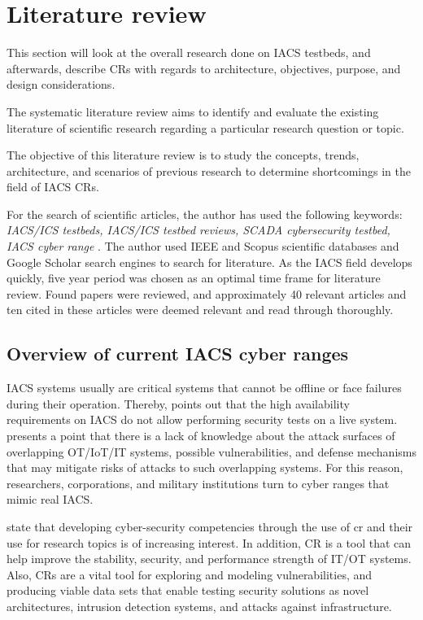 \section{Literature review} \label{sec:lit-rev}

This section will look at the overall research done on IACS testbeds, and afterwards, describe CRs with regards to architecture, objectives, purpose, and design considerations.
 

The systematic literature review aims to identify and evaluate the existing literature of scientific research regarding a particular research question or topic.

The objective of this literature review is to study the concepts, trends, architecture, and scenarios of previous research to determine shortcomings in the field of IACS CRs.

For the search of scientific articles, the author has used the following keywords: \textit{ IACS/ICS testbeds, IACS/ICS testbed reviews, SCADA cybersecurity testbed, IACS cyber range }. The author used IEEE and Scopus scientific databases and Google Scholar search engines to search for literature. As the IACS field develops quickly, five year period was chosen as an optimal time frame for literature review. Found papers were reviewed, and approximately 40 relevant articles and ten cited in these articles were deemed relevant and read through thoroughly.

\subsection{Overview of current IACS cyber ranges}

IACS systems usually are critical systems that cannot be offline or face failures during their operation. Thereby, \citeauthor{02-surway} \parencite{02-surway} points out that the high availability requirements on IACS do not allow performing security tests on a live system. \citeauthor{09-iiot-testbed-architecture} \parencite{09-iiot-testbed-architecture} presents a point that there is a lack of knowledge about the attack surfaces of overlapping OT/IoT/IT systems, possible vulnerabilities, and defense mechanisms that may mitigate risks of attacks to such overlapping systems. For this reason, researchers, corporations, and military institutions turn to cyber ranges that mimic real IACS.

\citeauthor{29-ICS-cyber-range-scenarios} \parencite{29-ICS-cyber-range-scenarios} state that developing cyber-security competencies through the use of \gls*{cr} and their use for research topics is of increasing interest. In addition, CR is a tool that can help improve the stability, security, and performance strength of IT/OT systems. Also, CRs are a vital tool for exploring and modeling vulnerabilities, and producing viable data sets that enable testing security solutions as novel architectures, intrusion detection systems, and attacks against infrastructure.

